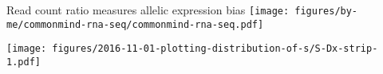 \documentclass{beamer} %
\begin{document}
\begin{frame}{Read count ratio measures allelic expression bias}
\texttt{[image: figures/by-me/commonmind-rna-seq/commonmind-rna-seq.pdf]}
\end{frame}

\begin{frame}[plain]
\begin{center}
\texttt{[image: figures/2016-11-01-plotting-distribution-of-s/S-Dx-strip-1.pdf]}
\end{center}
\end{frame}
\end{document}
